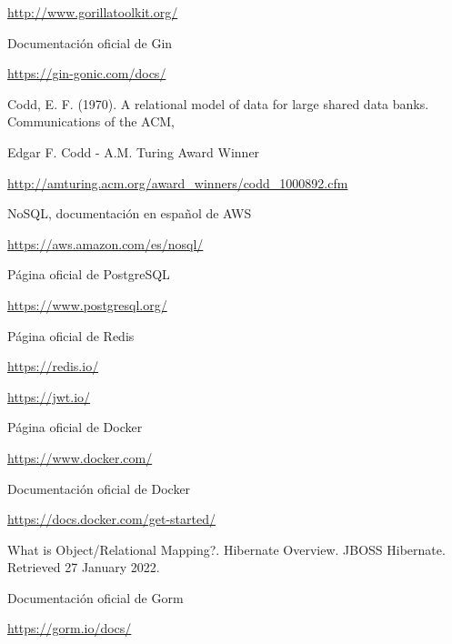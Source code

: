 \begin{thebibliography}{X}
\url{http://www.gorillatoolkit.org/}

 Documentación oficial de Gin

\url{https://gin-gonic.com/docs/}

 Codd, E. F. (1970). A relational model of data for large shared data banks. Communications of the ACM,

  Edgar F. Codd - A.M. Turing Award Winner

\url{http://amturing.acm.org/award_winners/codd_1000892.cfm}

 NoSQL, documentación en español de AWS

\url{https://aws.amazon.com/es/nosql/}

 Página oficial de PostgreSQL

\url{https://www.postgresql.org/}

 Página oficial de Redis

\url{https://redis.io/}

 \url{https://jwt.io/}

 Página oficial de Docker

\url{https://www.docker.com/}

 Documentación oficial de Docker

\url{https://docs.docker.com/get-started/}

 What is Object/Relational Mapping?. Hibernate Overview. JBOSS Hibernate. Retrieved 27 January 2022.

 Documentación oficial de Gorm

\url{https://gorm.io/docs/}
	
\end{thebibliography}